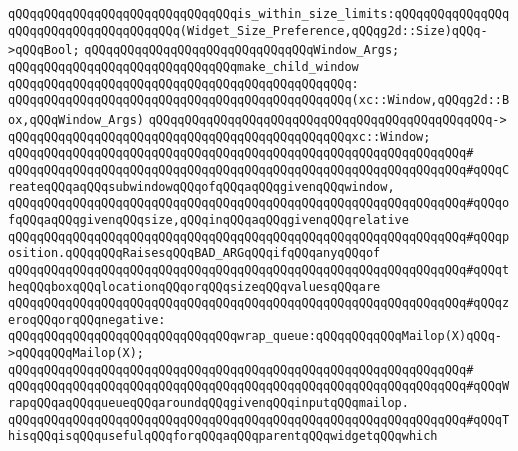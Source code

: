 \verb|qQQqqQQqqQQqqQQqqQQqqQQqqQQqqQQqis_within_size_limits:qQQqqQQqqQQqqQQqqQQqqQQqqQQqqQQqqQQqqQQq(Widget_Size_Preference,qQQqg2d::Size)qQQq->qQQqBool;|\newline
\newline
\verb|qQQqqQQqqQQqqQQqqQQqqQQqqQQqqQQqWindow_Args;|\newline
\newline
\verb|qQQqqQQqqQQqqQQqqQQqqQQqqQQqqQQqmake_child_window|\newline
\verb|qQQqqQQqqQQqqQQqqQQqqQQqqQQqqQQqqQQqqQQqqQQqqQQq:|\newline
\verb|qQQqqQQqqQQqqQQqqQQqqQQqqQQqqQQqqQQqqQQqqQQqqQQq(xc::Window,qQQqg2d::Box,qQQqWindow_Args)|\newline
\verb|qQQqqQQqqQQqqQQqqQQqqQQqqQQqqQQqqQQqqQQqqQQqqQQq->|\newline
\verb|qQQqqQQqqQQqqQQqqQQqqQQqqQQqqQQqqQQqqQQqqQQqqQQqxc::Window;|\newline
\verb|qQQqqQQqqQQqqQQqqQQqqQQqqQQqqQQqqQQqqQQqqQQqqQQqqQQqqQQqqQQqqQQq#|\newline
\verb|qQQqqQQqqQQqqQQqqQQqqQQqqQQqqQQqqQQqqQQqqQQqqQQqqQQqqQQqqQQqqQQq#qQQqCreateqQQqaqQQqsubwindowqQQqofqQQqaqQQqgivenqQQqwindow,|\newline
\verb|qQQqqQQqqQQqqQQqqQQqqQQqqQQqqQQqqQQqqQQqqQQqqQQqqQQqqQQqqQQqqQQq#qQQqofqQQqaqQQqgivenqQQqsize,qQQqinqQQqaqQQqgivenqQQqrelative|\newline
\verb|qQQqqQQqqQQqqQQqqQQqqQQqqQQqqQQqqQQqqQQqqQQqqQQqqQQqqQQqqQQqqQQq#qQQqposition.qQQqqQQqRaisesqQQqBAD_ARGqQQqifqQQqanyqQQqof|\newline
\verb|qQQqqQQqqQQqqQQqqQQqqQQqqQQqqQQqqQQqqQQqqQQqqQQqqQQqqQQqqQQqqQQq#qQQqtheqQQqboxqQQqlocationqQQqorqQQqsizeqQQqvaluesqQQqare|\newline
\verb|qQQqqQQqqQQqqQQqqQQqqQQqqQQqqQQqqQQqqQQqqQQqqQQqqQQqqQQqqQQqqQQq#qQQqzeroqQQqorqQQqnegative:|\newline
\newline
\verb|qQQqqQQqqQQqqQQqqQQqqQQqqQQqqQQqwrap_queue:qQQqqQQqqQQqMailop(X)qQQq->qQQqqQQqMailop(X);|\newline
\verb|qQQqqQQqqQQqqQQqqQQqqQQqqQQqqQQqqQQqqQQqqQQqqQQqqQQqqQQqqQQqqQQq#|\newline
\verb|qQQqqQQqqQQqqQQqqQQqqQQqqQQqqQQqqQQqqQQqqQQqqQQqqQQqqQQqqQQqqQQq#qQQqWrapqQQqaqQQqqueueqQQqaroundqQQqgivenqQQqinputqQQqmailop.|\newline
\verb|qQQqqQQqqQQqqQQqqQQqqQQqqQQqqQQqqQQqqQQqqQQqqQQqqQQqqQQqqQQqqQQq#qQQqThisqQQqisqQQqusefulqQQqforqQQqaqQQqparentqQQqwidgetqQQqwhich|\newline
